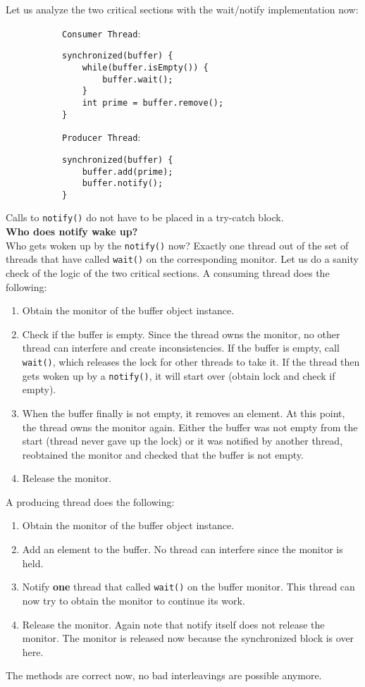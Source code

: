 \documentclass[main.tex]{subfiles}
\begin{document}
Let us analyze the two critical sections with the wait/notify implementation now:
\begin{figure}[H] \begin{subfigure}[t]{.52\textwidth}
        \texttt{Consumer Thread}:
        \begin{verbatim}
synchronized(buffer) {
    while(buffer.isEmpty()) {
        buffer.wait();
    }
    int prime = buffer.remove();
}
        \end{verbatim}
    \end{subfigure}%
    \begin{subfigure}[t]{.52\textwidth}
        \texttt{Producer Thread}:
        \begin{verbatim}
synchronized(buffer) {
    buffer.add(prime);
    buffer.notify();
}
        \end{verbatim}
    \end{subfigure}
\end{figure}
Calls to \texttt{notify()} do not have to be placed in a try-catch block. \\[3mm]
\textbf{Who does notify wake up?}\\
Who gets woken up by the \texttt{notify()} now? Exactly one thread out of the set of threads that have called \texttt{wait()} on the corresponding monitor. Let us do a sanity check of the logic of the two critical sections. A consuming thread does the following:
\begin{enumerate}
    \item Obtain the monitor of the buffer object instance.
    \item Check if the buffer is empty. Since the thread owns the monitor, no other thread can interfere and create inconsistencies. If the buffer is empty, call \texttt{wait()}, which releases the lock for other threads to take it. If the thread then gets woken up by a \texttt{notify()}, it will start over (obtain lock and check if empty).
    \item When the buffer finally is not empty, it removes an element. At this point, the thread owns the monitor again. Either the buffer was not empty from the start (thread never gave up the lock) or it was notified by another thread, reobtained the monitor and checked that the buffer is not empty.
    \item Release the monitor.
\end{enumerate}
A producing thread does the following:
\begin{enumerate}
    \item Obtain the monitor of the buffer object instance.
    \item Add an element to the buffer. No thread can interfere since the monitor is held.
    \item Notify \textbf{one} thread that called \texttt{wait()} on the buffer monitor. This thread can now try to obtain the monitor to continue its work.
    \item Release the monitor. Again note that notify itself does not release the monitor. The monitor is released now because the synchronized block is over here.
\end{enumerate}
The methods are correct now, no bad interleavings are possible anymore.
\end{document}
